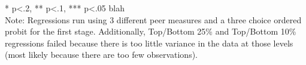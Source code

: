\begin{sidewaystable}[htb]
\begin{threeparttable}
\begin{tabular}{l|c|c|c|c|c|c|c|c}
      \hline
      \hline
    \end{tabular}
    \begin{tablenotes}
    \item{* p<.2, ** p<.1, *** p<.05 blah \\Note: Regressions run using 3 different peer measures and a three choice ordered probit for the first stage. Additionally, Top/Bottom 25\% and Top/Bottom 10\% regressions failed because there is too little variance in the data at those levels (most likely because there are too few observations).}
    \end{tablenotes}
  \end{threeparttable}
\end{sidewaystable}

